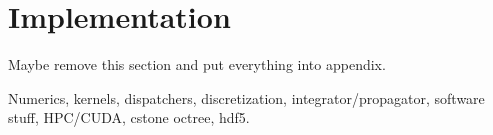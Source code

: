 \section{Implementation}
Maybe remove this section and put everything into appendix.

Numerics, kernels, dispatchers, discretization, integrator/propagator, software stuff, HPC/CUDA, cstone octree, hdf5. 

